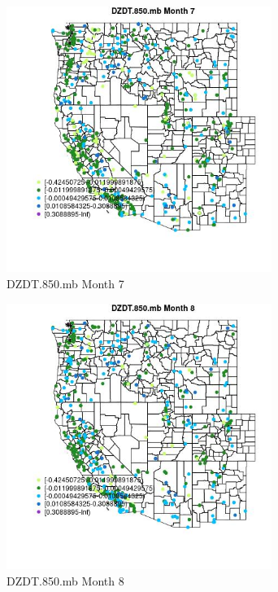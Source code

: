 \begin{figure} 
\centering  
\includegraphics[width=0.77\textwidth]{Code_Outputs/Report_ML_input_PM25_Step4_part_e_de_duplicated_aves_compiled_2019-05-14wNAs_MapObsMo7DZDT850mb.jpg} 
\caption{\label{fig:Report_ML_input_PM25_Step4_part_e_de_duplicated_aves_compiled_2019-05-14wNAsMapObsMo7DZDT850mb}DZDT.850.mb Month 7} 
\end{figure} 
 

\begin{figure} 
\centering  
\includegraphics[width=0.77\textwidth]{Code_Outputs/Report_ML_input_PM25_Step4_part_e_de_duplicated_aves_compiled_2019-05-14wNAs_MapObsMo8DZDT850mb.jpg} 
\caption{\label{fig:Report_ML_input_PM25_Step4_part_e_de_duplicated_aves_compiled_2019-05-14wNAsMapObsMo8DZDT850mb}DZDT.850.mb Month 8} 
\end{figure} 
 

